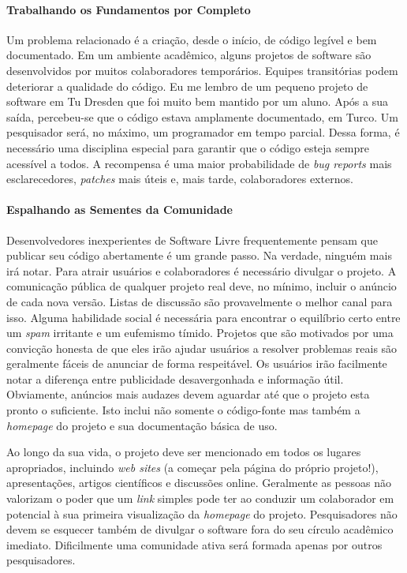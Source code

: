 \paragraph*{Trabalhando os Fundamentos por Completo}
Um problema relacionado é a criação, desde o início, de código legível e bem documentado.
Em um ambiente acadêmico, alguns projetos de software são desenvolvidos por muitos colaboradores
temporários. Equipes transitórias podem deteriorar a qualidade do código. Eu me lembro de um
pequeno projeto de software em Tu Dresden que foi muito bem mantido por um aluno. Após a sua saída,
percebeu-se que o código estava amplamente documentado, em Turco. Um pesquisador será, no máximo,
um programador em tempo parcial. Dessa forma, é necessário uma disciplina especial para garantir
que o código esteja sempre acessível a todos. A recompensa é uma maior probabilidade de
\textit{bug reports} mais esclarecedores, \textit{patches} mais úteis e, mais tarde, colaboradores
externos.

\paragraph*{Espalhando as Sementes da Comunidade}
Desenvolvedores inexperientes de Software Livre frequentemente pensam que
publicar seu código abertamente é um grande passo. Na verdade, ninguém mais
irá notar. Para atrair usuários e colaboradores é necessário divulgar o projeto.
A comunicação pública de qualquer projeto real deve, no mínimo, incluir o anúncio
de cada nova versão. Listas de discussão são provavelmente o melhor canal para isso.
Alguma habilidade social é necessária para encontrar o equilíbrio certo entre um
\textit{spam} irritante e um eufemismo tímido. Projetos que são motivados por uma
convicção honesta de que eles irão ajudar usuários a resolver problemas reais são
geralmente fáceis de anunciar de forma respeitável. Os usuários irão facilmente notar
a diferença entre publicidade desavergonhada e informação útil. Obviamente, anúncios
mais audazes devem aguardar até que o projeto esta pronto o suficiente. Isto inclui
não somente o código-fonte mas também a \textit{homepage} do projeto e sua
documentação básica de uso.

Ao longo da sua vida, o projeto deve ser mencionado em todos os lugares apropriados,
incluindo \textit{web sites} (a começar pela página do próprio projeto!), apresentações,
artigos científicos e discussões online. Geralmente as pessoas não valorizam o poder
que um \textit{link} simples pode ter ao conduzir um colaborador em potencial à sua
primeira visualização da \textit{homepage} do projeto. Pesquisadores não devem se
esquecer também de divulgar o software fora do seu círculo acadêmico imediato. Dificilmente
uma comunidade ativa será formada apenas por outros pesquisadores.

